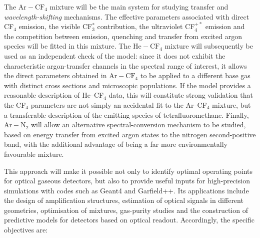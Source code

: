\documentclass[12pt,a4paper]{article}
\newcommand{\N}{\mathrm{N}}
\newcommand{\He}{\mathrm{He}}
\newcommand{\Ar}{\mathrm{Ar}}
\newcommand{\CF}{\mathrm{CF}}
\begin{document}
The $\Ar-\CF_4$ mixture will be the main system for studying transfer and \emph{wavelength-shifting} mechanisms. The effective parameters associated with direct CF$_4$ emission, the visible CF$_3^*$ contribution, the ultraviolet CF$_4^{+*}$ emission and the competition between emission, quenching and transfer from excited argon species will be fitted in this mixture. The $\He-\CF_4$ mixture will subsequently be used as an independent check of the model: since it does not exhibit the characteristic argon-transfer channels in the spectral range of interest, it allows the direct parameters obtained in $\Ar-\CF_4$ to be applied to a different base gas with distinct cross sections and microscopic populations. If the model provides a reasonable description of He--CF$_4$ data, this will constitute strong validation that the CF$_4$ parameters are not simply an accidental fit to the Ar--CF$_4$ mixture, but a transferable description of the emitting species of tetrafluoromethane. Finally, $\Ar-\N_2$ will allow an alternative spectral-conversion mechanism to be studied, based on energy transfer from excited argon states to the nitrogen second-positive band, with the additional advantage of being a far more environmentally favourable mixture.

This approach will make it possible not only to identify optimal operating points for optical gaseous detectors, but also to provide useful inputs for high-precision simulations with codes such as Geant4 and Garfield++. Its applications include the design of amplification structures, estimation of optical signals in different geometries, optimisation of mixtures, gas-purity studies and the construction of predictive models for detectors based on optical readout. Accordingly, the specific objectives are:
\end{document}
